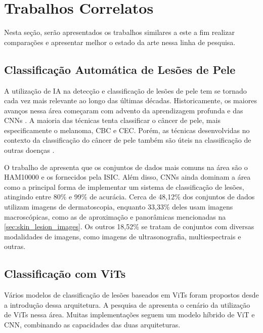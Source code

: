 \chapter{Trabalhos Correlatos}

Nesta seção, serão apresentados os trabalhos similares a este a fim realizar comparações e apresentar melhor o estado
da
arte nessa linha de pesquisa.

\section{Classificação Automática de Lesões de Pele}

A utilização de \ac{IA} na detecção e classificação de lesões de pele tem se tornado cada vez mais relevante ao longo
das últimas décadas. Historicamente, os maiores avanços nessa área começaram com advento da aprendizagem profunda e das
\acp{CNN} \cite{li2019artificial}. A maioria das técnicas tenta classificar o câncer de pele, mais especificamente o
melanoma, \ac{CBC} e \ac{CEC}. Porém, as técnicas desenvolvidas no contexto da classificação do câncer de pele também
são úteis na classificação de outras doenças \cite{okuboyejo2018review}.

O trabalho de \textcite{skin_cancer_ai} apresenta que os conjuntos de dados mais comuns na área são o \ac{HAM10000} e
os fornecidos pela \ac{ISIC}. Além disso, \acp{CNN} ainda dominam a área como a principal forma de implementar um
sistema de classificação de lesões, atingindo entre 80\% e 99\% de acurácia. Cerca de 48,12\% dos conjuntos de dados
utilizam imagens de dermatoscopia, enquanto 33,33\% deles usam imagens macroscópicas, como as de aproximação e
panorâmicas mencionadas na \autoref{sec:skin_lesion_images}. Os outros 18,52\% se tratam de conjuntos com diversas
modalidades de imagens, como imagens de ultrasonografia, multiespectrais e outras.

\section{Classificação com ViTs}

Vários modelos de classificação de lesões baseados em \acp{ViT} foram propostos desde a introdução dessa arquitetura. A
pesquisa de \textcite{khan2023identifying} apresenta o cenário da utilização de \acp{ViT} nessa área. Muitas
implementações seguem um modelo híbrido de \ac{ViT} e \ac{CNN}, combinando as capacidades das duas arquiteturas.

